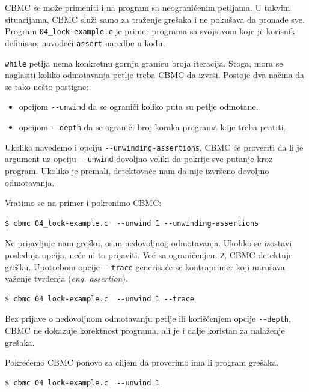 CBMC se može primeniti i na program sa neograničenim petljama. U takvim situacijama, CBMC služi samo za traženje grešaka i ne pokušava da pronađe sve. Program \texttt{04\_lock-example.c} je primer programa sa svojstvom koje je korisnik definisao, navodeći \texttt{assert} naredbe u kodu.

\texttt{while} petlja nema konkretnu gornju granicu broja iteracija. Stoga, mora se naglasiti koliko odmotavanja petlje treba CBMC da izvrši. Postoje dva načina da se tako nešto postigne:

\begin{itemize}
\tightlist
\item
  opcijom \texttt{-{}-unwind} da se ograniči koliko puta su petlje odmotane.
\item
  opcijom \texttt{-{}-depth} da se ograniči broj koraka programa koje treba pratiti.
\end{itemize}

Ukoliko navedemo i opciju \texttt{-{}-unwinding-assertions}, CBMC će proveriti da li je argument uz opciju \texttt{-{}-unwind} dovoljno veliki da pokrije sve putanje kroz program. Ukoliko je premali, detektovaće nam da nije izvršeno dovoljno odmotavanja.

Vratimo se na primer i pokrenimo CBMC:

\begin{verbatim}
$ cbmc 04_lock-example.c  --unwind 1 --unwinding-assertions
\end{verbatim}

Ne prijavljuje nam grešku, osim nedovoljnog odmotavanja. Ukoliko se izostavi poslednja opcija, neće ni to prijaviti. Već sa ograničenjem \texttt{2}, CBMC detektuje grešku. Upotrebom opcije \texttt{-{}-trace} generisaće se kontraprimer koji narušava važenje tvrđenja (\emph{eng. assertion}).

\begin{verbatim}
$ cbmc 04_lock-example.c  --unwind 1 --trace
\end{verbatim}

Bez prijave o nedovoljnom odmotavanju petlje ili korišćenjem opcije \texttt{-{}-depth}, CBMC ne dokazuje korektnost programa, ali je i dalje koristan za nalaženje grešaka.

Pokrećemo CBMC ponovo sa ciljem da proverimo ima li program grešaka.

\begin{verbatim}
$ cbmc 04_lock-example.c  --unwind 1
\end{verbatim}

